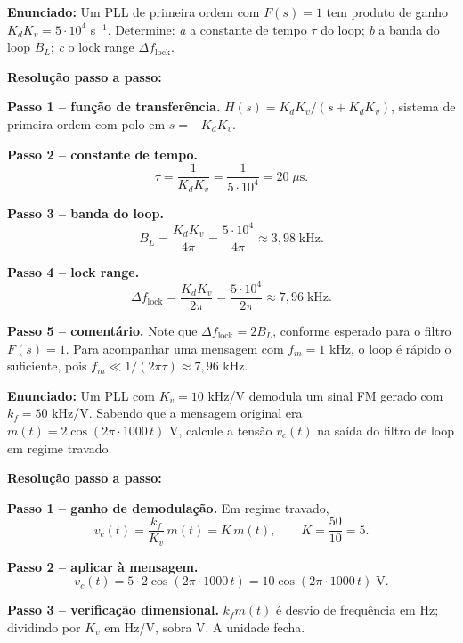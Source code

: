 \documentclass[11pt,a4paper]{article}
\begin{document}
\begin{exercicio}
\textbf{Enunciado:} Um PLL de primeira ordem com $F(s)=1$ tem produto de ganho $K_d K_v = 5\!\cdot\!10^{4}$ s$^{-1}$. Determine:
\emph{a} a constante de tempo $\tau$ do loop;
\emph{b} a banda do loop $B_L$;
\emph{c} o lock range $\Delta f_{\text{lock}}$.

\textbf{Resolução passo a passo:}

\textbf{Passo 1 -- função de transferência.}
$H(s) = K_d K_v / (s + K_d K_v)$, sistema de primeira ordem com polo em $s=-K_d K_v$.

\textbf{Passo 2 -- constante de tempo.}
\[
  \tau = \frac{1}{K_d K_v} = \frac{1}{5\!\cdot\!10^{4}} = 20\;\mu\text{s}.
\]

\textbf{Passo 3 -- banda do loop.}
\[
  B_L = \frac{K_d K_v}{4\pi} = \frac{5\!\cdot\!10^{4}}{4\pi} \approx 3{,}98\;\text{kHz}.
\]

\textbf{Passo 4 -- lock range.}
\[
  \Delta f_{\text{lock}} = \frac{K_d K_v}{2\pi} = \frac{5\!\cdot\!10^{4}}{2\pi} \approx 7{,}96\;\text{kHz}.
\]

\textbf{Passo 5 -- comentário.}
Note que $\Delta f_{\text{lock}}=2 B_L$, conforme esperado para o filtro $F(s)=1$. Para acompanhar uma mensagem com $f_m = 1$ kHz, o loop é rápido o suficiente, pois $f_m \ll 1/(2\pi\tau)\approx 7{,}96$ kHz.
\end{exercicio}

\begin{exercicio}
\textbf{Enunciado:} Um PLL com $K_v=10$ kHz/V demodula um sinal FM gerado com $k_f=50$ kHz/V. Sabendo que a mensagem original era $m(t)=2\cos(2\pi\!\cdot\!1000\,t)$ V, calcule a tensão $v_c(t)$ na saída do filtro de loop em regime travado.

\textbf{Resolução passo a passo:}

\textbf{Passo 1 -- ganho de demodulação.}
Em regime travado,
\[
  v_c(t) = \frac{k_f}{K_v}\,m(t) = K\,m(t), \qquad K = \frac{50}{10} = 5.
\]

\textbf{Passo 2 -- aplicar à mensagem.}
\[
  v_c(t) = 5\!\cdot\!2\cos(2\pi\!\cdot\!1000\,t) = 10\cos(2\pi\!\cdot\!1000\,t)\;\text{V}.
\]

\textbf{Passo 3 -- verificação dimensional.}
$k_f m(t)$ é desvio de frequência em Hz; dividindo por $K_v$ em Hz/V, sobra V. A unidade fecha.
\end{exercicio}
\end{document}
